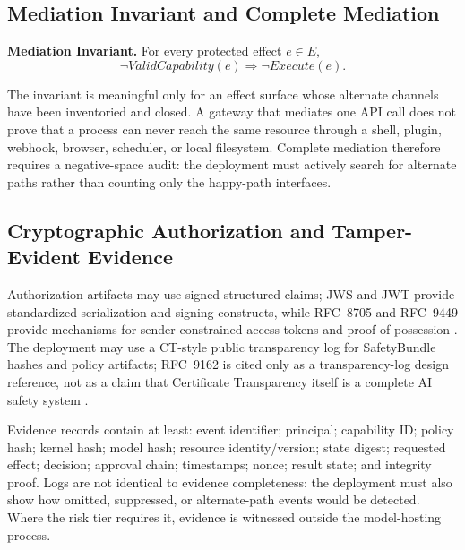 \documentclass[11pt]{article}
\def\mathrm#1{#1}%
\newcommand{\SafetyBundle}{\textsf{SafetyBundle}}
\begin{document}
\subsection{Mediation Invariant and Complete Mediation}\label{sec:invariant}
\begin{keyresult}
\textbf{Mediation Invariant.} For every protected effect \(e\in E\),
\[
\neg\mathrm{ValidCapability}(e)\Rightarrow\neg\mathrm{Execute}(e).
\]
\end{keyresult}
The invariant is meaningful only for an effect surface whose alternate channels have been inventoried and closed. A gateway that mediates one API call does not prove that a process can never reach the same resource through a shell, plugin, webhook, browser, scheduler, or local filesystem. Complete mediation therefore requires a negative-space audit: the deployment must actively search for alternate paths rather than counting only the happy-path interfaces.

\subsection{Cryptographic Authorization and Tamper-Evident Evidence}
Authorization artifacts may use signed structured claims; JWS and JWT provide standardized serialization and signing constructs, while RFC~8705 and RFC~9449 provide mechanisms for sender-constrained access tokens and proof-of-possession \cite{rfc7515,rfc7519,rfc8705,rfc9449}. The deployment may use a CT-style public transparency log for \SafetyBundle{} hashes and policy artifacts; RFC~9162 is cited only as a transparency-log design reference, not as a claim that Certificate Transparency itself is a complete AI safety system \cite{rfc9162}.

Evidence records contain at least: event identifier; principal; capability ID; policy hash; kernel hash; model hash; resource identity/version; state digest; requested effect; decision; approval chain; timestamps; nonce; result state; and integrity proof. Logs are not identical to evidence completeness: the deployment must also show how omitted, suppressed, or alternate-path events would be detected. Where the risk tier requires it, evidence is witnessed outside the model-hosting process.
\end{document}
